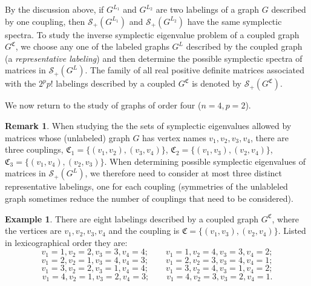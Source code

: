 \documentclass[12pt]{article}
\theoremstyle{definition}
\newtheorem{rem}[thm]{Remark}
\theoremstyle{definition}
\theoremstyle{definition}
\newtheorem{ex}[thm]{Example}
\numberwithin{figure}{section}
\numberwithin{equation}{section}
\newcommand{\GLG}{G^L}
\newcommand{\GC}[2]{#1 ^ {\mathfrak #2}}
\newcommand{\PP}{\mathfrak{C}}
\newcommand{\symp}{\mathcal{S}_+}
\begin{document}
By the discussion above, if $G^{L_1}$ and $G^{L_2}$ are two labelings of a graph $G$  described by one coupling, then $\symp(G^{L_1})$ and $\symp(G^{L_2})$ have the same symplectic spectra.  To study the inverse symplectic eigenvalue problem of a coupled graph $\GC G C$, we  choose any one of the labeled graphs $\GLG$ described by the coupled graph (a \emph{representative labeling}) and then determine the possible symplectic spectra of matrices in $\symp(\GLG)$.   
 The family of all real positive definite matrices associated with the $2^pp!$ labelings described by a coupled $\GC G C$  is denoted by $\symp(\GC G C)$.

We now return to the study of graphs of order four ($n=4, p=2$). 

\begin{rem}\label{r:ord4couplings}
     When studying the 
the sets of symplectic eigenvalues allowed by 
matrices whose (unlabeled) graph $G$ has vertex names $v_1,v_2,v_3,v_4$,  there are  three couplings, 
 $\PP_1=\{(v_1,v_2),(v_3,v_4)\}$, $\PP_2=\{(v_1,v_3),(v_2,v_4)\}$, $\PP_3=\{(v_1,v_4),(v_2,v_3)\}$.  When determining possible symplectic eigenvalues of matrices in $\symp(G^L)$, we  therefore need to consider at most three distinct representative labelings, one for each coupling (symmetries of the unlableled graph sometimes reduce the number of couplings that need to be considered).
\end{rem}

 \begin{ex}
 There are 
eight labelings  described by a coupled graph $\GC G C$, where the vertices are $v_1,v_2,v_3,v_4$ and the coupling is $\PP=\{(v_1,v_3), (v_2,v_4)\}$. Listed in lexicographical order they are:
\[
v_1=1, v_2=2, v_3=3, v_4=4; \qquad 
v_1=1, v_2=4, v_3=3, v_4=2; \]
\[v_1=2, v_2=1, v_3=4, v_4=3; \qquad 
v_1=2, v_2=3, v_3=4, v_4=1;  \]
\[v_1=3, v_2=2, v_3=1, v_4=4; \qquad 
v_1=3, v_2=4, v_3=1, v_4=2; \] 
\[v_1=4, v_2=1, v_3=2, v_4=3; \qquad 
v_1=4, v_2=3, v_3=2, v_4=1.
\] 
\end{ex}
\end{document}
